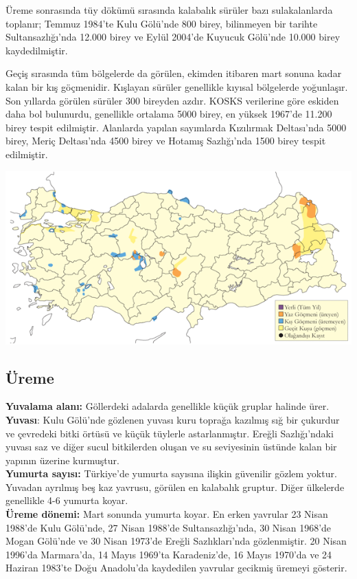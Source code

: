 \documentclass[
  letterpaper,
  DIV=11,
  numbers=noendperiod]{scrreprt}
\begin{document}
Üreme sonrasında tüy dökümü sırasında kalabalık sürüler bazı
sulakalanlarda toplanır; Temmuz 1984'te Kulu Gölü'nde 800 birey,
bilinmeyen bir tarihte Sultansazlığı'nda 12.000 birey ve Eylül 2004'de
Kuyucuk Gölü'nde 10.000 birey kaydedilmiştir.

Geçiş sırasında tüm bölgelerde da görülen, ekimden itibaren mart sonuna
kadar kalan bir kış göçmenidir. Kışlayan sürüler genellikle kıyısal
bölgelerde yoğunlaşır. Son yıllarda görülen sürüler 300 bireyden azdır.
KOSKS verilerine göre eskiden daha bol bulunurdu, genellikle ortalama
5000 birey, en yüksek 1967'de 11.200 birey tespit edilmiştir. Alanlarda
yapılan sayımlarda Kızılırmak Deltası'nda 5000 birey, Meriç Deltası'nda
4500 birey ve Hotamış Sazlığı'nda 1500 birey tespit edilmiştir.

\includegraphics{images/harita_Page_002.png}

\hypertarget{uxfcreme}{%
\subsection{\texorpdfstring{\textbf{Üreme}}{Üreme}}\label{uxfcreme}}

\textbf{Yuvalama alanı:} Göllerdeki adalarda genellikle küçük gruplar
halinde ürer.\\
\textbf{Yuvası}: Kulu Gölü'nde gözlenen yuvası kuru toprağa kazılmış sığ
bir çukurdur ve çevredeki bitki örtüsü ve küçük tüylerle astarlanmıştır.
Ereğli Sazlığı'ndaki yuvası saz ve diğer sucul bitkilerden oluşan ve su
seviyesinin üstünde kalan bir yapının üzerine kurmuştur.\\
\textbf{Yumurta sayısı:} Türkiye'de yumurta sayısına ilişkin güvenilir
gözlem yoktur. Yuvadan ayrılmış beş kaz yavrusu, görülen en kalabalık
gruptur. Diğer ülkelerde genellikle 4-6 yumurta koyar.\\
\textbf{Üreme dönemi:} Mart sonunda yumurta koyar. En erken yavrular 23
Nisan 1988'de Kulu Gölü'nde, 27 Nisan 1988'de Sultansazlığı'nda, 30
Nisan 1968'de Mogan Gölü'nde ve 30 Nisan 1973'de Ereğli Sazlıkları'nda
gözlenmiştir. 20 Nisan 1996'da Marmara'da, 14 Mayıs 1969'ta
Karadeniz'de, 16 Mayıs 1970'da ve 24 Haziran 1983'te Doğu Anadolu'da
kaydedilen yavrular gecikmiş üremeyi gösterir.
\end{document}
